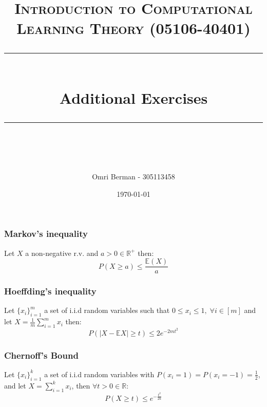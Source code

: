 \documentclass{article} %
\title{
\normalfont \normalsize 
\textsc{Introduction to Computational Learning Theory (05106-40401)} \\
[10pt] 
\rule{\linewidth}{0.5pt} \\[6pt] 
\huge Additional Exercises \\
\rule{\linewidth}{2pt}  \\[10pt]
}
\author{Omri Berman - 305113458}
\date{\normalsize \today}
\begin{document}
\maketitle
\noindent

\subsubsection*{Markov's inequality}
Let $X$ a non-negative r.v. and $a>0 \in \mathbb{R^+}$ then:
\begin{equation*}
    P(X\geq a) \leq \frac{\mathbb{E}(X)}{a}
\end{equation*}

\subsubsection*{Hoeffding's inequality}
Let $\{x_i\}_{i=1}^m$ a set of i.i.d random variables such that $0 \leq x_i \leq 1, \; \forall i \in [m]$ and let $X = \frac{1}{m} \sum_{i=1}^m x_i$ then:
\begin{equation*}
    P(|X - \mathbb{E}X| \geq t) \leq 2e^{-2mt^2}
\end{equation*}

\subsubsection*{Chernoff's Bound}
Let $\{x_i\}_{i=1}^k$ a set of i.i.d random variables with $P(x_i=1)= P(x_i=-1) = \frac{1}{2}$, and let $X = \sum_{i=1}^k x_i$, then $\forall t>0 \in \mathbb{R}$:
\begin{equation*}
    P(X\geq t) \leq e^{-\frac{t^2}{2k}}
\end{equation*}
\end{document}
